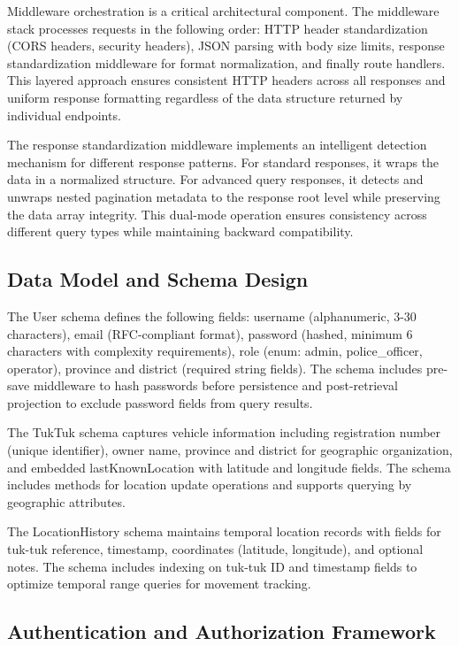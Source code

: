 \documentclass[12pt,a4paper]{article}
\begin{document}
Middleware orchestration is a critical architectural component. The middleware stack processes requests in the following order: HTTP header standardization (CORS headers, security headers), JSON parsing with body size limits, response standardization middleware for format normalization, and finally route handlers. This layered approach ensures consistent HTTP headers across all responses and uniform response formatting regardless of the data structure returned by individual endpoints.

The response standardization middleware implements an intelligent detection mechanism for different response patterns. For standard responses, it wraps the data in a normalized structure. For advanced query responses, it detects and unwraps nested pagination metadata to the response root level while preserving the data array integrity. This dual-mode operation ensures consistency across different query types while maintaining backward compatibility.

\subsection{Data Model and Schema Design}

The User schema defines the following fields: username (alphanumeric, 3-30 characters), email (RFC-compliant format), password (hashed, minimum 6 characters with complexity requirements), role (enum: admin, police\_officer, operator), province and district (required string fields). The schema includes pre-save middleware to hash passwords before persistence and post-retrieval projection to exclude password fields from query results.

The TukTuk schema captures vehicle information including registration number (unique identifier), owner name, province and district for geographic organization, and embedded lastKnownLocation with latitude and longitude fields. The schema includes methods for location update operations and supports querying by geographic attributes.

The LocationHistory schema maintains temporal location records with fields for tuk-tuk reference, timestamp, coordinates (latitude, longitude), and optional notes. The schema includes indexing on tuk-tuk ID and timestamp fields to optimize temporal range queries for movement tracking.

\subsection{Authentication and Authorization Framework}
\end{document}
